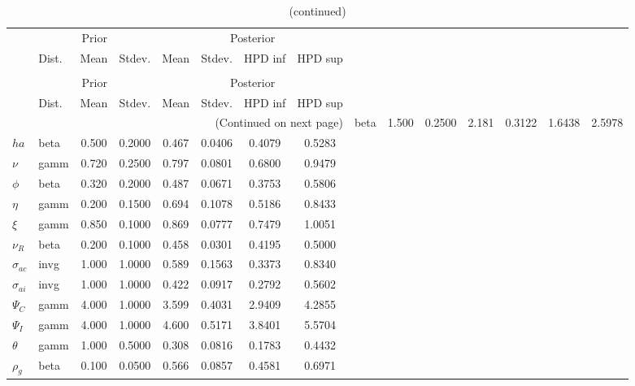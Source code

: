  
\begin{center}
\begin{longtable}{llcccccc} 
\caption{Results from Metropolis-Hastings (parameters)}
 \label{Table:MHPosterior:1}\\
\toprule 
  & \multicolumn{3}{c}{Prior}  &  \multicolumn{4}{c}{Posterior} \\
  \cmidrule(r{.75em}){2-4} \cmidrule(r{.75em}){5-8}
  & Dist. & Mean  & Stdev. & Mean & Stdev. & HPD inf & HPD sup\\
\midrule \endfirsthead 
\caption{(continued)}\\\toprule 
  & \multicolumn{3}{c}{Prior}  &  \multicolumn{4}{c}{Posterior} \\
  \cmidrule(r{.75em}){2-4} \cmidrule(r{.75em}){5-8}
  & Dist. & Mean  & Stdev. & Mean & Stdev. & HPD inf & HPD sup\\
\midrule \endhead 
\bottomrule \multicolumn{8}{r}{(Continued on next page)} \endfoot 
\bottomrule \endlastfoot 
${\sigma}$ & beta &   1.500 & 0.2500 &   2.181& 0.3122 &  1.6438 &  2.5978 \\ 
${ha}$ & beta &   0.500 & 0.2000 &   0.467& 0.0406 &  0.4079 &  0.5283 \\ 
$\nu$ & gamm &   0.720 & 0.2500 &   0.797& 0.0801 &  0.6800 &  0.9479 \\ 
${\phi}$ & beta &   0.320 & 0.2000 &   0.487& 0.0671 &  0.3753 &  0.5806 \\ 
${\eta}$ & gamm &   0.200 & 0.1500 &   0.694& 0.1078 &  0.5186 &  0.8433 \\ 
$\xi$ & gamm &   0.850 & 0.1000 &   0.869& 0.0777 &  0.7479 &  1.0051 \\ 
${\nu_R}$ & beta &   0.200 & 0.1000 &   0.458& 0.0301 &  0.4195 &  0.5000 \\ 
${\sigma_{ac}}$ & invg &   1.000 & 1.0000 &   0.589& 0.1563 &  0.3373 &  0.8340 \\ 
${\sigma_{ai}}$ & invg &   1.000 & 1.0000 &   0.422& 0.0917 &  0.2792 &  0.5602 \\ 
${\Psi_{C}}$ & gamm &   4.000 & 1.0000 &   3.599& 0.4031 &  2.9409 &  4.2855 \\ 
${\Psi_I}$ & gamm &   4.000 & 1.0000 &   4.600& 0.5171 &  3.8401 &  5.5704 \\ 
${\theta}$ & gamm &   1.000 & 0.5000 &   0.308& 0.0816 &  0.1783 &  0.4432 \\ 
${\rho_g}$ & beta &   0.100 & 0.0500 &   0.566& 0.0857 &  0.4581 &  0.6971 \\ 

\end{longtable}
\end{center}
